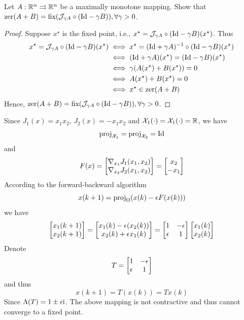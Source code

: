 \documentclass[a4 paper, 12pt]{article}
\begin{document}
\vspace{2em}
 Let $A:\mathbb{R}^n \rightrightarrows \mathbb{R}^n$ be a maximally monotone mapping. Show that $\textnormal{zer}(A+B) = \textnormal{fix}(\mathcal{J}_{\gamma A}\circ(\textnormal{Id}-\gamma B)), \forall \gamma>0$.
\begin{proof}
        
Suppose $x^\star$ is the fixed point, i.e., $x^\star = \mathcal{J}_{\gamma A}\circ(\textnormal{Id}-\gamma B)(x^\star)$. Thus
\begin{equation}
        \begin{aligned}
                x^\star = \mathcal{J}_{\gamma A}\circ(\textnormal{Id}-\gamma B)(x^\star) 
                &\iff x^\star = (\textnormal{Id}+\gamma A)^{-1}\circ(\textnormal{Id}-\gamma B)(x^\star) \\
                &\iff (\textnormal{Id}+\gamma A)(x^\star) = (\textnormal{Id}-\gamma B)(x^\star) \\
                &\iff \gamma(A(x^\star)+B(x^\star)) = 0 \\
                &\iff A(x^\star) + B(x^\star) = 0 \\
                &\iff x^\star \in \textnormal{zer}(A+B)
        \end{aligned}
\end{equation}
Hence, $\textnormal{zer}(A+B) = \textnormal{fix}(\mathcal{J}_{\gamma A}\circ(\textnormal{Id}-\gamma B)), \forall \gamma>0$.

\end{proof}


\vspace{2em}

Since $J_1(x) = x_1x_2$, $J_2(x)= -x_1x_2$ and $\mathcal{X}_1(\cdot)=\mathcal{X}_1(\cdot)=\mathbb{R}$, we have 
\begin{equation}
        \textnormal{proj}_{\mathcal{X}_1} = \textnormal{proj}_{\mathcal{X}_2} = \textnormal{Id}
\end{equation}
and 
\begin{equation}
        F(x) = \begin{bmatrix} \nabla_{x_1} J_1(x_1,x_2)  \\ \nabla_{x_2}J_2(x_1,x_2) \end{bmatrix} = \begin{bmatrix} x_2 \\ -x_1 \end{bmatrix}
\end{equation}
According to the forward-backward algorithm
\begin{equation}
        x(k+1) = \textnormal{proj}_{\Omega}(x(k) - \epsilon F(x(k)))
\end{equation}
we have 
\begin{equation}
        \begin{bmatrix} x_1(k+1) \\ x_2(k+1) \end{bmatrix} = \begin{bmatrix} x_1(k)-\epsilon(x_2(k)) \\ x_2(k) + \epsilon x_1(k) \end{bmatrix} = \begin{bmatrix} 1 &-\epsilon \\ \epsilon &1 \end{bmatrix} \begin{bmatrix} x_1(k) \\ x_2(k) \end{bmatrix}
\end{equation}
Denote
\begin{equation}
        T = \begin{bmatrix} 1 &-\epsilon \\ \epsilon &1 \end{bmatrix}
\end{equation}
and thus
\begin{equation}
        x(k+1) = T(x(k)) = Tx(k)
\end{equation}
Since $\Lambda(T) = 1\pm \epsilon\textnormal{i}$. The above mapping is not contractive and thus cannot converge to a fixed point. 
\end{document}
